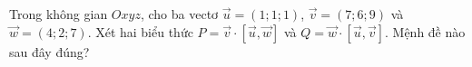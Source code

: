 \begin{ex}
Trong không gian $Oxyz$, cho ba vectơ $\vec u=(1;1;1)$, $\vec v=(7;6;9)$ và $\vec w=(4;2;7)$. Xét hai biểu thức $P=\vec v\cdot\left[\vec u,\vec w\right]$ và $Q=\vec w\cdot\left[\vec u,\vec v\right]$. Mệnh đề nào sau đây đúng?
\end{ex}
